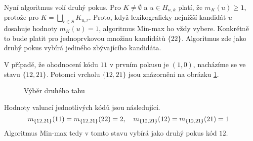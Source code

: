 Nyní algoritmus volí druhý pokus. Pro $K \neq \emptyset$ a $u \in H_{n,k}$ platí, že $m_K(u) \geq 1$, protože pro $K = \bigsqcup_{r\in S} K_{u,r}$. Proto, když lexikograficky nejnižší kandidát $u$ dosahuje hodnoty $m_K(u) = 1$, algoritmus Min-max ho vždy vybere. Konkrétně to bude platit pro jednoprvkovou množinu kandidátů $\{22\}$. Algoritmus zde jako druhý pokus vybírá jediného zbývajícího kandidáta. 

V případě, že ohodnocení kódu $11$ v prvním pokusu je $(1,0)$, nacházíme se ve stavu $\{12,21\}$. Potomci vrcholu $\{12,21\}$ jsou znázorněni na obrázku \ref{fig22druhytah}. 
\begin{figure}[h!]
    \centering
    \caption{Výběr druhého tahu}
\label{fig22druhytah}
\end{figure}
Hodnoty valuací jednotlivých kódů jsou následující.
\[m_{\{12,21\}} (11) = m_{\{12,21\}} (22) = 2, \hspace{10px} m_{\{12,21\}} (12) = m_{\{12,21\}} (21) = 1\]
Algoritmus Min-max tedy v tomto stavu vybírá jako druhý pokus kód $12$. 

